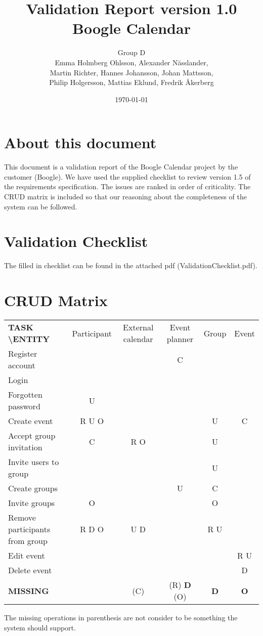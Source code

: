 \documentclass[a4paper]{article}
\title{Validation Report version 1.0\\ Boogle Calendar}
\author{Group D\\ Emma Holmberg Ohlsson, Alexander Nässlander,\\Martin Richter, Hannes Johansson, Johan Mattsson,\\Philip Holgersson, Mattias Eklund, Fredrik Åkerberg}
\date{\today}
\begin{document}
	\maketitle
	\thispagestyle{empty}
	\setcounter{page}{0}
	\pagebreak
	
	\section{About this document}	
		This document is a validation report of the Boogle Calendar project by the customer (Boogle). We have used the supplied checklist to review version 1.5 of the requirements specification. The issues are ranked in order of criticality. The CRUD matrix is included so that our reasoning about the completeness of the system can be followed.
	
	\section{Validation Checklist}
		
		The filled in checklist can be found in the attached pdf (ValidationChecklist.pdf).

	\section{CRUD Matrix}
			\begin{center}
		
		
			\begin{tabular}{|l||c|c|c|c|c|}
			\hline 
			\textbf{TASK \textbackslash ENTITY} & Participant & External calendar & Event planner & Group & Event \\ 
			\hhline{|=||=|=|=|=|=|}
			Register account & & & C & & \\ 
			\hline 
			Login & & & & & \\ 
			\hline 
			Forgotten password & U & & & & \\ 
			\hline 
			Create event & R U O & & & U & C \\ 
			\hline 
			Accept group invitation & C & R O & & U & \\ 
			\hline 
			Invite users to group & & & & U & \\ 
			\hline 
			Create groups & & & U & C & \\ 
			\hline 
			Invite groups & O & & & O & \\ 
			\hline 
			Remove participants from group & R D O & U D & & R U & \\ 
			\hline 
			Edit event & & & & & R U \\ 
			\hline 
			Delete event & & & & & D \\ 
			\hhline{|=||=|=|=|=|=|}
			\textbf{MISSING} & & (C) & (R) \textbf{D} (O) & \textbf{D} & \textbf{O} \\ 
			\hline 
			\end{tabular} 
	
		\end{center}	
		The missing operations in parenthesis are not consider to be something the system should support.
	
\end{document}
